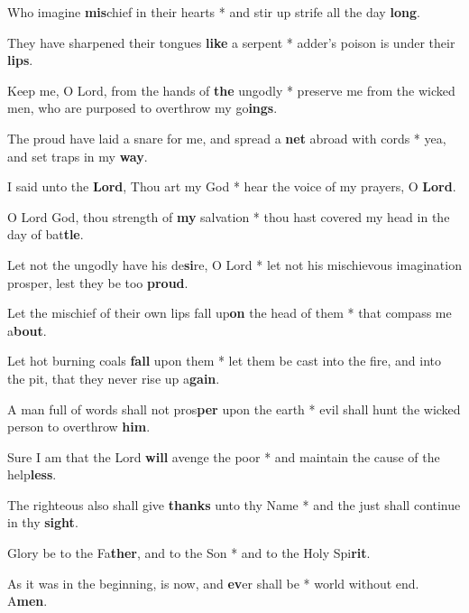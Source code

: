 \begin{multicols}{2}
	Who imagine \textbf{mis}chief in their hearts * and stir up strife all the day \textbf{long}.
	
	They have sharpened their tongues \textbf{like} a serpent * adder's poison is under their \textbf{lips}.
	
	Keep me, O Lord, from the hands of \textbf{the} ungodly * preserve me from the wicked men, who are purposed to overthrow my go\textbf{ings}.
	
	The proud have laid a snare for me, and spread a \textbf{net} abroad with cords * yea, and set traps in my \textbf{way}.
	
	I said unto the \textbf{Lord}, Thou art my God * hear the voice of my prayers, O \textbf{Lord}.
	
	O Lord God, thou strength of \textbf{my} salvation * thou hast covered my head in the day of bat\textbf{tle}.
	
	Let not the ungodly have his de\textbf{si}re, O Lord * let not his mischievous imagination prosper, lest they be too \textbf{proud}.
	
	Let the mischief of their own lips fall up\textbf{on} the head of them * that compass me a\textbf{bout}.
	
	Let hot burning coals \textbf{fall} upon them * let them be cast into the fire, and into the pit, that they never rise up a\textbf{gain}.
	
	A man full of words shall not pros\textbf{per} upon the earth * evil shall hunt the wicked person to overthrow \textbf{him}.
	
	Sure I am that the Lord \textbf{will} avenge the poor * and maintain the cause of the help\textbf{less}.
	
	The righteous also shall give \textbf{thanks} unto thy Name * and the just shall continue in thy \textbf{sight}.
	
	Glory be to the Fa\textbf{ther}, and to the Son * and to the Holy Spi\textbf{rit}.
	
	As it was in the beginning, is now, and \textbf{ev}er shall be * world without end. A\textbf{men}.
\end{multicols}